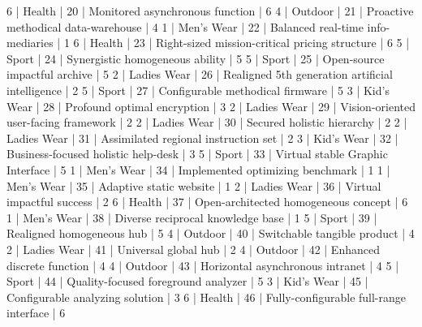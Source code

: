 \begin{enumerate}
\begin{pseudo*}
      6 | Health      |      20 | Monitored asynchronous function                  |        6   
      4 | Outdoor     |      21 | Proactive methodical data-warehouse              |        4   
      1 | Men's Wear  |      22 | Balanced real-time info-mediaries                |        1   
      6 | Health      |      23 | Right-sized mission-critical pricing structure   |        6   
      5 | Sport       |      24 | Synergistic homogeneous ability                  |        5   
      5 | Sport       |      25 | Open-source impactful archive                    |        5   
      2 | Ladies Wear |      26 | Realigned 5th generation artificial intelligence |        2   
      5 | Sport       |      27 | Configurable methodical firmware                 |        5   
      3 | Kid's Wear  |      28 | Profound optimal encryption                      |        3   
      2 | Ladies Wear |      29 | Vision-oriented user-facing framework            |        2   
      2 | Ladies Wear |      30 | Secured holistic hierarchy                       |        2   
      2 | Ladies Wear |      31 | Assimilated regional instruction set             |        2   
      3 | Kid's Wear  |      32 | Business-focused holistic help-desk              |        3   
      5 | Sport       |      33 | Virtual stable Graphic Interface                 |        5   
      1 | Men's Wear  |      34 | Implemented optimizing benchmark                 |        1   
      1 | Men's Wear  |      35 | Adaptive static website                          |        1   
      2 | Ladies Wear |      36 | Virtual impactful success                        |        2   
      6 | Health      |      37 | Open-architected homogeneous concept             |        6   
      1 | Men's Wear  |      38 | Diverse reciprocal knowledge base                |        1   
      5 | Sport       |      39 | Realigned homogeneous hub                        |        5   
      4 | Outdoor     |      40 | Switchable tangible product                      |        4   
      2 | Ladies Wear |      41 | Universal global hub                             |        2   
      4 | Outdoor     |      42 | Enhanced discrete function                       |        4   
      4 | Outdoor     |      43 | Horizontal asynchronous intranet                 |        4   
      5 | Sport       |      44 | Quality-focused foreground analyzer              |        5   
      3 | Kid's Wear  |      45 | Configurable analyzing solution                  |        3   
      6 | Health      |      46 | Fully-configurable full-range interface          |        6   

\end{pseudo*}
\end{enumerate}
